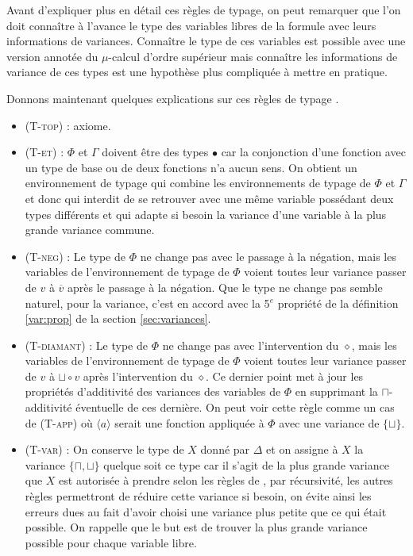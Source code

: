 \documentclass{rapport}
\theoremstyle{plain}
\theoremstyle{remark}
\theoremstyle{definition}
\begin{document}
Avant d'expliquer plus en détail ces règles de typage, on peut remarquer que l'on doit connaître à l'avance le type des variables libres de la formule avec leurs informations de variances. Connaître le type de ces variables est possible avec une version annotée du $\mu$-calcul d'ordre supérieur mais connaître les informations de variance de ces types est une hypothèse plus compliquée à mettre en pratique. 

Donnons maintenant quelques explications sur ces règles de typage .
\begin{itemize}
	\item (\textsc{T-top}) : axiome.
	\item (\textsc{T-et}) : $\Phi$ et $\Gamma$ doivent être des types $\bullet$ car la conjonction d'une fonction avec un type de base ou de deux fonctions n'a aucun sens. On obtient un environnement de typage qui combine les environnements de typage de $\Phi$ et $\Gamma$ et donc qui interdit de se retrouver avec une même variable possédant deux types différents et qui adapte si besoin la variance d'une variable à la plus grande variance commune.
	\item (\textsc{T-neg}) : Le type de $\Phi$ ne change pas avec le passage à la négation, mais les variables de l'environnement de typage de $\Phi$ voient toutes leur variance passer de $v$ à $\overline{v}$ après le passage à la négation. Que le type ne change pas semble naturel, pour la variance, c'est en accord avec la 5$^e$ propriété de la définition \ref{var:prop} de la section \ref{sec:variances}.
	\item (\textsc{T-diamant}) : Le type de $\Phi$ ne change pas avec l'intervention du $\diamond$, mais les variables de l'environnement de typage de $\Phi$ voient toutes leur variance passer de $v$ à $\sqcup \circ v$ après l'intervention du $\diamond$. Ce dernier point met à jour les propriétés d'additivité des variances des variables de $\Phi$ en supprimant la $\sqcap$-additivité éventuelle de ces dernière. On peut voir cette règle comme un cas de (\textsc{T-app}) où $\langle a \rangle$ serait une fonction appliquée à $\Phi$ avec une variance de $\{\sqcup\}$.
	\item (\textsc{T-var}) : On conserve le type de $X$ donné par $\Delta$ et on assigne à $X$ la variance $\{\sqcap, \sqcup\}$ quelque soit ce type car il s'agit de la plus grande variance que $X$ est autorisée à prendre selon les règles de \citep{lange2014model}, par récursivité, les autres règles permettront de réduire cette variance si besoin, on évite ainsi les erreurs dues au fait d'avoir choisi une variance plus petite que ce qui était possible. On rappelle que le but est de trouver la plus grande variance possible pour chaque variable libre.

\end{itemize}
\end{document}

